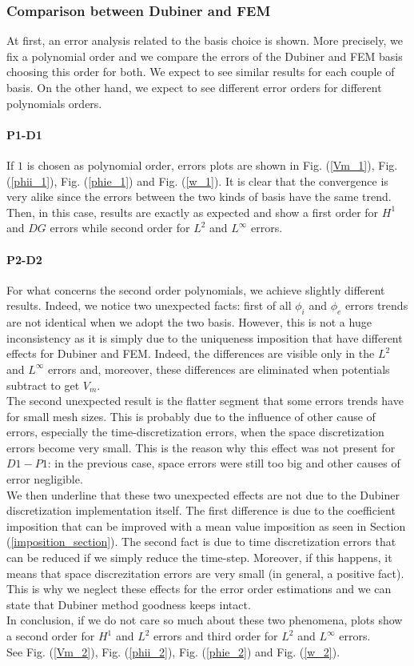 \documentclass[a4paper,11pt]{article}
\begin{document}
\subsubsection{Comparison between Dubiner and FEM}
At first, an error analysis related to the basis choice is shown. More precisely, we fix a polynomial order and we compare the errors of the Dubiner and FEM basis choosing this order for both. We expect to see similar results for each couple of basis. On the other hand, we expect to see different error orders for different polynomials orders.
\paragraph{P1-D1}
If $1$ is chosen as polynomial order, errors plots are shown in Fig. (\ref{Vm_1}), Fig. (\ref{phii_1}), Fig. (\ref{phie_1}) and Fig. (\ref{w_1}). 
\noindent It is clear that the convergence is very alike since the errors between the two kinds of basis have the same trend. Then, in this case, results are exactly as expected and show a first order for $H^1$ and $DG$ errors while second order for $L^2$ and $L^\infty$ errors.
\paragraph{P2-D2} \label{P2-D2}
\noindent  For what concerns the second order polynomials, we achieve slightly different results. Indeed, we notice two unexpected facts: first of all $\phi_i$ and $\phi_e$ errors trends are not identical when we adopt the two basis. However, this is not a huge inconsistency as it is simply due to the uniqueness imposition that have different effects for Dubiner and FEM. Indeed, the differences are visible only in the $L^2$ and $L^\infty$ errors and, moreover, these differences are eliminated when potentials subtract to get $V_m$. \\
The second unexpected result is the flatter segment that some errors trends have for small mesh sizes. This is probably due to the influence of other cause of errors, especially the time-discretization errors, when the space discretization errors become very small. This is the reason why this effect was not present for $D1-P1$: in the previous case, space errors were still too big and other causes of error negligible. \\
We then underline that these two unexpected effects are not due to the Dubiner discretization implementation itself. The first difference is due to the coefficient imposition that can be improved with a mean value imposition as seen in Section (\ref{imposition_section}). The second fact is due to time discretization errors that can be reduced if we simply reduce the time-step. Moreover, if this happens, it means that space discrezitation errors are very small (in general, a positive fact). This is why we neglect these effects for the error order estimations and we can state that Dubiner method goodness keeps intact. \\
In conclusion, if we do not care so much about these two phenomena, plots show a second order for $H^1$ and $L^2$ errors and third order for $L^2$ and $L^\infty$ errors.\\
\noindent See Fig. (\ref{Vm_2}), Fig. (\ref{phii_2}), Fig. (\ref{phie_2}) and Fig. (\ref{w_2}). 
\end{document}
